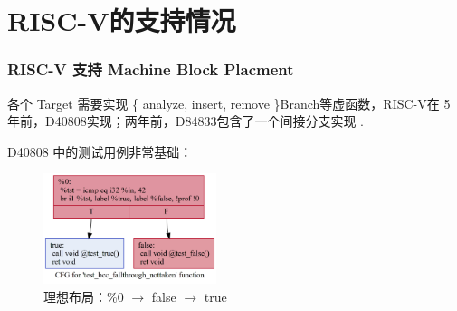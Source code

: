 \section{RISC-V的支持情况}

\begin{frame}
    \frametitle{RISC-V 支持 Machine Block Placment}

    各个 Target 需要实现 \{ analyze, insert, remove \}Branch等虚函数，RISC-V在 5 年前，D40808\cite{llvmriscvimplbranchanalysis2017}实现；两年前，D84833包含了一个间接分支实现 \cite{llvmriscvimplindirect2020}.

    D40808\cite{llvmriscvimplbranchanalysis2017} 中的测试用例非常基础：

    \begin{figure}
        \centering
        \includegraphics[width=0.45\textwidth]{images/not_taken_riscv.png}
        \caption{理想布局：\%0 $\rightarrow$ false $\rightarrow$ true}
    \end{figure}

\end{frame}